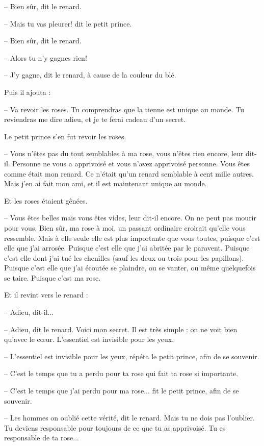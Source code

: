 \documentclass[a4paper]{report}
\begin{document}
-- Bien sûr, dit le renard.

-- Mais tu vas pleurer! dit le petit prince.

-- Bien sûr, dit le renard.

-- Alors tu n'y gagnes rien!

-- J'y gagne, dit le renard, à cause de la couleur du blé.

Puis il ajouta :

-- Va revoir les roses. Tu comprendras que la tienne est unique au monde. Tu reviendras me dire adieu, et je te ferai cadeau d'un secret.

Le petit prince s'en fut revoir les roses.

-- Vous n'êtes pas du tout semblables à ma rose, vous n'êtes rien encore, leur dit-il. Personne ne vous a apprivoisé et vous n'avez apprivoisé personne. Vous êtes comme était mon renard. Ce n'était qu'un renard semblable à cent mille autres. Mais j'en ai fait mon ami, et il est maintenant unique au monde.

Et les roses étaient gênées.

-- Vous êtes belles mais vous êtes vides, leur dit-il encore. On ne peut pas mourir pour vous. Bien sûr, ma rose à moi, un passant ordinaire croirait qu'elle vous ressemble. Mais à elle seule elle est plus importante que vous toutes, puisque c'est elle que j'ai arrosée. Puisque c'est elle que j'ai abritée par le paravent. Puisque c'est elle dont j'ai tué les chenilles (sauf les deux ou trois pour les papillons). Puisque c'est elle que j'ai écoutée se plaindre, ou se vanter, ou même quelquefois se taire. Puisque c'est ma rose.

Et il revint vers le renard :

-- Adieu, dit-il...

-- Adieu, dit le renard. Voici mon secret. Il est très simple : on ne voit bien qu'avec le cœur. L'essentiel est invisible pour les yeux.

-- L'essentiel est invisible pour les yeux, répéta le petit prince, afin de se souvenir.

-- C'est le temps que tu a perdu pour ta rose qui fait ta rose si importante.

-- C'est le temps que j'ai perdu pour ma rose... fit le petit prince, afin de se souvenir.

-- Les hommes on oublié cette vérité, dit le renard. Mais tu ne dois pas l'oublier. Tu deviens responsable pour toujours de ce que tu as apprivoisé. Tu es responsable de ta rose...
\end{document}
